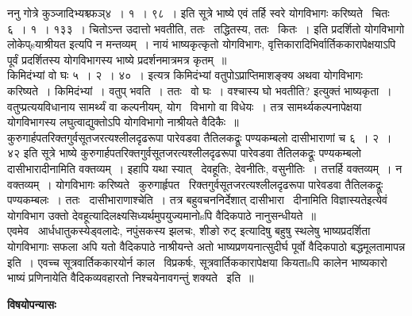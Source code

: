 \documentclass[11pt, openany]{book}
\begin{document}
ननु गोत्रे कुञ्जादिभ्यश्च्फञ्४~। १~। ९८~। इति सूत्रे भाष्ये एवं तर्हि स्वरे योगविभागः करिष्यते \textendash\ {\qt चितः} ६~। १~। १३३~। चितोऽन्त उदात्तो भवतीति, ततः \textendash\ तद्धितस्य, ततः \textendash\ कितः~। इति प्रदर्शितो योगविभागो लोकेप्sयाश्रीयत इत्यपि न मन्तव्यम्~। नायं भाष्यकृत्कृतो योगविभागः, वृत्तिकारादिभिर्वार्तिककारापेक्षयाऽपि पूर्वं प्रदर्शितस्य योगविभागस्य भाष्ये प्रदर्शनमात्रमत्र कृतम्~॥\\

किमिदंभ्यां वो घः ५~। २~। ४०~। इत्यत्र किमिदंभ्यां वतुपोऽप्राप्तिमाशङ्क्य {\qt अथवा योगविभागः करिष्यते~। किमिदंभ्यां~। वतुप् भवति~। ततः \textendash\ वो घः~। वश्चास्य घो भवतीति?} इत्युक्तं भाष्यकृता~। वतुप्प्रत्ययविधानाय सामर्थ्यं वा कल्पनीयम्, योग \textendash\ विभागो वा विधेयः~। तत्र सामर्थ्यकल्पनापेक्षया योगविभागस्य लघुत्वाद्युक्तोऽपि योगविभागो नाश्रीयते वैदिकैः~॥\\

कुरुगार्हपतरिक्तगुर्वसूतजरत्यश्लीलदृढरूपा पारेवडवा तैतिलकद्रूः पण्यकम्बलो दासीभाराणां च ६~। २~। ४२ इति सूत्रे भाष्ये कुरुगार्हपतरिक्तगुर्वसूतजरत्यश्लीलदृढरूपा पारेवडवा तैतिलकद्रूः पण्यकम्बलो दासीभारादीनामिति वक्तव्यम्~। इहापि यथा स्यात् \textendash\ देवहूतिः, देवनीतिः, वसुनीतिः~। तत्तर्हि वक्तव्यम्~। न वक्तव्यम्~। योगविभागः करिष्यते \textendash\ कुरुगार्हृपत \textendash\ रिक्तगुर्वसूतजरत्यश्लीलदृढरूपा पारेवडवा तैतिलकद्रूः पण्यकम्बलः~। ततः \textendash\ दासीभाराणाश्चेति~। तत्र बहुवचननिर्देशात् दासीभारा \textendash\ दीनामिति विज्ञास्यते{\qt इत्येवं योगविभाग उक्तो देवहूत्यादिलक्ष्यसिध्यर्थमुपयुज्यमानोsपि वैदिकपाठे नानुसन्धीयते~॥\\

एवमेव \textendash\ }आर्धधातुकस्येड्वलादेः, नपुंसकस्य झलचः, शीङो रुट् इत्यादिषु बहुषु स्थलेषु भाष्यप्रदर्शिता योगविभागाः सफला अपि यतो वैदिकपाठे नाश्रीयन्ते अतो भाष्यप्रणयनात्सुदीर्घ पूर्वो वैदिकपाठो बद्धमूलतामापन्न इति~। एवच्च सूत्रवार्तिककारयोर्न काल \textendash\ विप्रकर्षः, सूत्रवार्तिककारापेक्षया कियताsपि कालेन भाष्यकारो भाष्यं प्रणिनायेति वैदिकव्यवहारतो निश्चयेनावगन्तुं शक्यते \textendash\ इति~॥

\begin{center}
\textbf{\Large विषयोपन्यासः \textendash\ }
\end{center}
\end{document}
